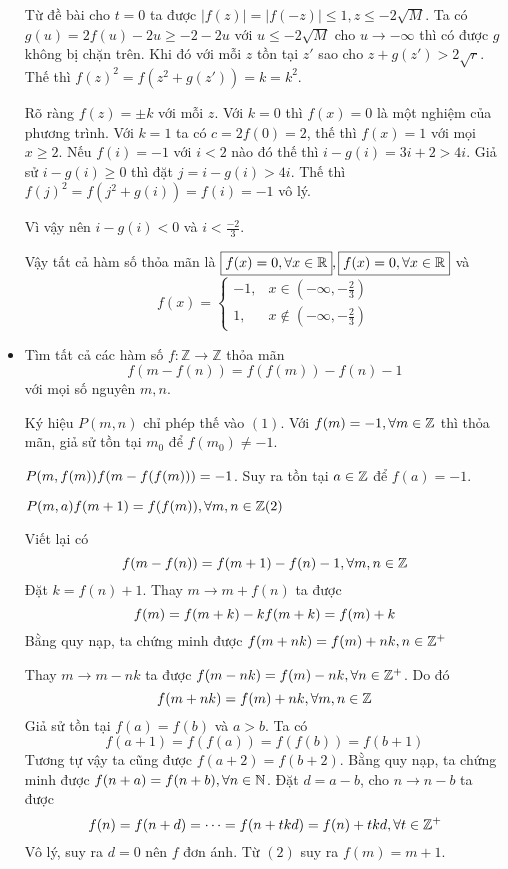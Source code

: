 \documentclass[11pt]{scrartcl}
\begin{document}
\begin{itemize}[label=, leftmargin=0em, itemsep=0.5em]
\begin{sol}
        Từ đề bài cho $t = 0$ ta được $|f(z)| = |f(-z)| \leq 1, z \leq -2\sqrt{M}$. Ta có $g(u) = 2f(u) - 2u \geq - 2-2u$ với $u \leq -2\sqrt{M}$ cho $u \to -\infty$ thì có được $g$ không bị chặn trên. Khi đó với mỗi $z$ tồn tại $z'$ sao cho $z + g(z') > 2\sqrt{r}$. Thế thì $f(z)^2 = f(z^2 + g(z')) = k = k^2$. 
        
        Rõ ràng $f(z) = \pm k$ với mỗi $z$. Với $k = 0$ thì $f(x) = 0$ là một nghiệm của phương trình. Với $k = 1$ ta có $c = 2f(0) = 2$, thế thì $f(x) = 1$ với mọi $x \geq 2$. Nếu $f(i) = - 1$ với $i < 2$ nào đó thế thì $i - g(i) = 3i + 2> 4i$. Giả sử $i - g(i) \geq 0$ thì đặt $j = i -g(i) > 4i$. Thế thì $f(j)^2 = f(j^2 + g(i)) = f(i) = -1$ vô lý. 
        
        Vì vậy nên $i - g(i) < 0$ và $i < \frac{-2}{3}$. 
        
        Vậy tất cả hàm số thỏa mãn là $\boxed{f(x) = 0 ,\forall x\in \mathbb{R}}, \boxed{f(x) = 0 ,\forall x\in \mathbb{R}}$ và 
        \[\boxed{ f(x)=
        \left\{\begin{array}{rr}-1,&x\in \left(-\infty,-\frac{2}{3}\right)\\
            1,&x\not\in \left(-\infty,-\frac{2}{3}\right)
        \end{array}
        \right.
        }
        \]
    \end{sol}
    \item \begin{bt}
        Tìm tất cả các hàm số $f: \mathbb{Z}\to \mathbb{Z}$ thỏa mãn
        \[
           f(m - f(n))  = f(f( m)) - f(n) -1\tag{1}
        \]
        với mọi số nguyên $m,n$.
    \end{bt}
    \begin{sol}
        Ký hiệu $P(m,n)$ chỉ phép thế vào $(1)$. 
        Với $f(m) = -1, \forall m \in \mathbb{Z}$ thì thỏa mãn, giả sử tồn tại $m_0$ để $f(m_0) \neq -1$.

        $P(m,f(m)) \ra f(m - f(f(m))) = -1$. Suy ra tồn tại $a \in \mathbb{Z}$ để $f(a) = -1$. 

        $P(m,a) \ra f(m + 1) = f(f(m)),\forall m,n\in \bb{Z} (2)$

        Viết lại có 
        \[
            f(m - f(n)) = f( m + 1) -f(n) - 1, \forall m,n \in \mathbb{Z}
        \]
        Đặt $k = f(n) + 1$. Thay $m \to m + f(n)$ ta được 
        \[
            f(m) =  f(m + k) -k \lra f(m + k) = f(m) +k
        \]
        Bằng quy nạp, ta chứng minh được $f(m + nk) = f(m) + nk, n \in \mathbb{Z^+}$

        Thay $m \to m - nk$ ta được $f(m - nk) = f(m) - nk, \forall n \in \mathbb{Z^+}$. Do đó 
        \[
            f(m + nk) = f(m) + nk, \forall m,n \in \mathbb{Z}
        \]
        Giả sử tồn tại $f(a) = f(b)$ và $a > b$. Ta có 
        \[
            f(a + 1) = f(f(a)) = f(f(b)) = f(b + 1)
        \]
        Tương tự vậy ta cũng được $f(a + 2) = f(b +2)$. Bằng quy nạp, ta chứng minh được $f(n + a) =f(n + b), \forall n \in \mathbb{N}$. Đặt $d = a - b$, cho $n \to n - b$ ta được 
        \[
            f(n) = f(n + d) = \dots = f(n + tkd) = f(n) + tkd, \forall t \in \mathbb{Z^+}
        \]
        Vô lý, suy ra $d = 0$ nên $f$ đơn ánh. Từ $(2)$ suy ra $f(m) = m + 1$.


\end{sol}
\end{itemize}
\end{document}
